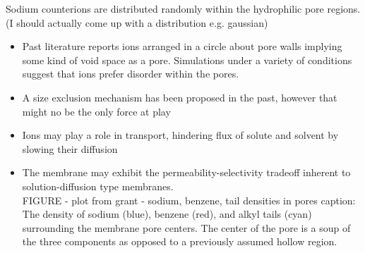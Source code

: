 \documentclass{article}
\begin{document}
	Sodium counterions are distributed randomly within the hydrophilic pore regions. (I should actually come up with a distribution e.g. gaussian) 
	\begin{itemize}
		\item Past literature reports ions arranged in a circle about pore walls implying some kind of void space as a pore. Simulations under a variety of conditions suggest that ions prefer disorder within the pores. 
		\item A size exclusion mechanism has been proposed in the past, however that might no be the only force at play
		\item Ions may play a role in transport, hindering flux of solute and solvent by slowing their diffusion
		\item The membrane may exhibit the permeability-selectivity tradeoff inherent to solution-diffusion type membranes.
		\\FIGURE - plot from grant - sodium, benzene, tail densities in pores
		caption: The density of sodium (blue), benzene (red), and alkyl tails (cyan) surrounding the membrane pore centers. The center of the pore is a soup of the three components as opposed to a previously assumed hollow region. 
	\end{itemize}	
	
	
\end{document}
